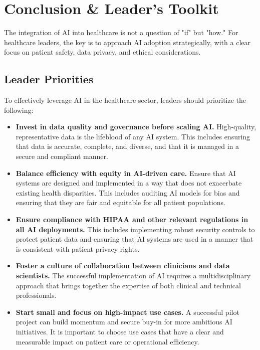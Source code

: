 \section{Conclusion \& Leader’s Toolkit}

The integration of AI into healthcare is not a question of "if" but "how." For healthcare leaders, the key is to approach AI adoption strategically, with a clear focus on patient safety, data privacy, and ethical considerations.

\subsection{Leader Priorities}
To effectively leverage AI in the healthcare sector, leaders should prioritize the following:
\begin{itemize}
    \item \textbf{Invest in data quality and governance before scaling AI.} High-quality, representative data is the lifeblood of any AI system. This includes ensuring that data is accurate, complete, and diverse, and that it is managed in a secure and compliant manner.
    \item \textbf{Balance efficiency with equity in AI-driven care.} Ensure that AI systems are designed and implemented in a way that does not exacerbate existing health disparities. This includes auditing AI models for bias and ensuring that they are fair and equitable for all patient populations.
    \item \textbf{Ensure compliance with HIPAA and other relevant regulations in all AI deployments.} This includes implementing robust security controls to protect patient data and ensuring that AI systems are used in a manner that is consistent with patient privacy rights.
    \item \textbf{Foster a culture of collaboration between clinicians and data scientists.} The successful implementation of AI requires a multidisciplinary approach that brings together the expertise of both clinical and technical professionals.
    \item \textbf{Start small and focus on high-impact use cases.} A successful pilot project can build momentum and secure buy-in for more ambitious AI initiatives. It is important to choose use cases that have a clear and measurable impact on patient care or operational efficiency.
\end{itemize}

